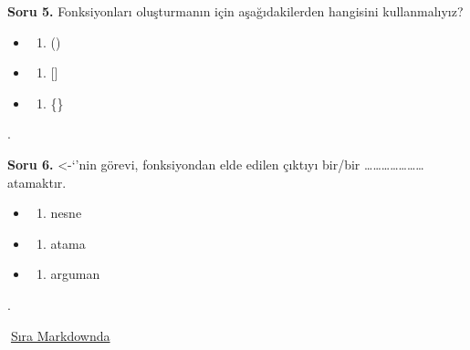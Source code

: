 \documentclass[
  oneside]{book}
\providecommand{\tightlist}{%
  \setlength{\itemsep}{0pt}\setlength{\parskip}{0pt}}
\begin{document}
\textbf{Soru 5.} Fonksiyonları oluşturmanın için aşağıdakilerden hangisini kullanmalıyız?

\begin{itemize}
\item
  \begin{enumerate}
  \def\labelenumi{(\Alph{enumi})}
  \tightlist
  \item
    ()\\
  \end{enumerate}
\item
  \begin{enumerate}
  \def\labelenumi{(\Alph{enumi})}
  \setcounter{enumi}{1}
  \tightlist
  \item
    {[}{]}\\
  \end{enumerate}
\item
  \begin{enumerate}
  \def\labelenumi{(\Alph{enumi})}
  \setcounter{enumi}{2}
  \tightlist
  \item
    \{\}
  \end{enumerate}
\end{itemize}

.

\textbf{Soru 6.} \textless-`'nin görevi, fonksiyondan elde edilen çıktıyı bir/bir \ldots\ldots\ldots\ldots\ldots\ldots\ldots{} atamaktır.

\begin{itemize}
\item
  \begin{enumerate}
  \def\labelenumi{(\Alph{enumi})}
  \tightlist
  \item
    nesne\\
  \end{enumerate}
\item
  \begin{enumerate}
  \def\labelenumi{(\Alph{enumi})}
  \setcounter{enumi}{1}
  \tightlist
  \item
    atama\\
  \end{enumerate}
\item
  \begin{enumerate}
  \def\labelenumi{(\Alph{enumi})}
  \setcounter{enumi}{2}
  \tightlist
  \item
    arguman
  \end{enumerate}
\end{itemize}

.

\begin{try}
🔗\href{https://atalay-k.github.io/OLC750/sunu/T_Dokumantasyon.html\#1}{Sıra Markdownda}

\end{try}
\end{document}

